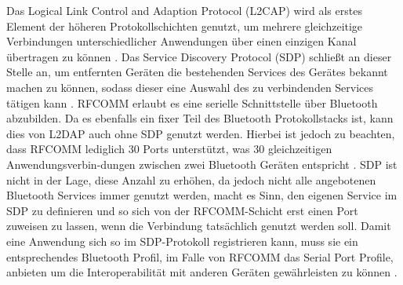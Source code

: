	Das Logical Link Control and Adaption Protocol (L2CAP) wird als erstes Element der höheren Protokollschichten genutzt, um mehrere gleichzeitige Verbindungen unterschiedlicher Anwendungen über einen einzigen Kanal übertragen zu können \cite[S.395]{Sauter}. Das Service Discovery Protocol (SDP) schließt an dieser Stelle an, um entfernten Geräten die bestehenden Services des Gerätes bekannt machen zu können, sodass dieser eine Auswahl des zu verbindenden Services tätigen kann \cite[S.395]{morrow}. RFCOMM erlaubt es eine serielle Schnittstelle über Bluetooth abzubilden. Da es ebenfalls ein fixer Teil des Bluetooth Protokollstacks ist, kann dies von L2DAP auch ohne SDP genutzt werden. Hierbei ist jedoch zu beachten, dass RFCOMM lediglich 30 Ports unterstützt, was 30 gleichzeitigen Anwendungsverbin-dungen zwischen zwei Bluetooth Geräten entspricht \cite[S.398]{Sauter}. SDP ist nicht in der Lage, diese Anzahl zu erhöhen, da jedoch nicht alle angebotenen Bluetooth Services immer genutzt werden, macht es Sinn, den eigenen Service im SDP zu definieren und so sich von der RFCOMM-Schicht erst einen Port zuweisen zu lassen, wenn die Verbindung tatsächlich genutzt werden soll. Damit eine Anwendung sich so im SDP-Protokoll registrieren kann, muss sie ein entsprechendes Bluetooth Profil, im Falle von RFCOMM das Serial Port Profile, anbieten um die Interoperabilität mit anderen Geräten gewährleisten zu können \cite[S.411]{Sauter}.
	

